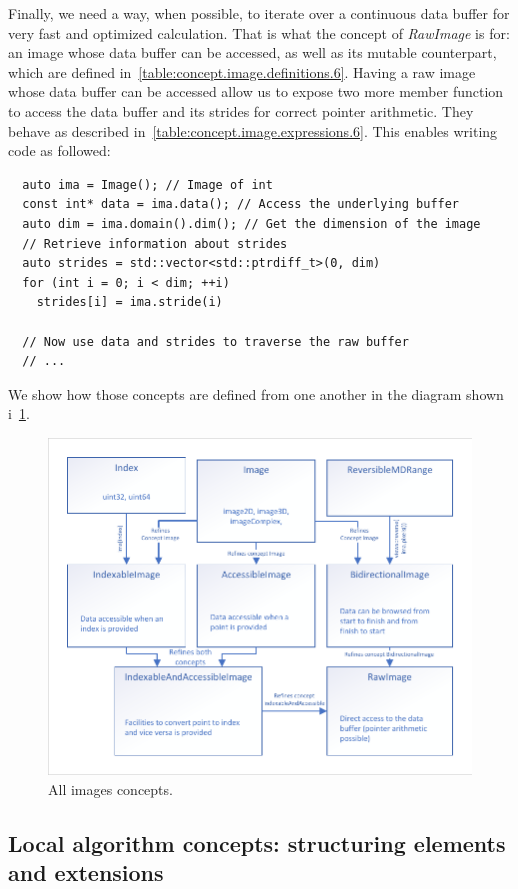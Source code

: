 Finally, we need a way, when possible, to iterate over a continuous data buffer for very fast and optimized calculation.
That is what the concept of \emph{RawImage} is for: an image whose data buffer can be accessed, as well as its mutable
counterpart, which are defined in~\cref{table:concept.image.definitions.6}. Having a raw image whose data buffer can be
accessed allow us to expose two more member function to access the data buffer and its strides for correct pointer
arithmetic. They behave as described in~\cref{table:concept.image.expressions.6}. This enables writing code as followed:
\begin{verbatim}
  auto ima = Image(); // Image of int
  const int* data = ima.data(); // Access the underlying buffer
  auto dim = ima.domain().dim(); // Get the dimension of the image
  // Retrieve information about strides
  auto strides = std::vector<std::ptrdiff_t>(0, dim)
  for (int i = 0; i < dim; ++i)
    strides[i] = ima.stride(i)

  // Now use data and strides to traverse the raw buffer
  // ...
\end{verbatim}

We show how those concepts are defined from one another in the diagram shown i~\cref{fig:concept.images}.

\begin{figure}[htbp]
  \centering
  \includegraphics[width=.8\linewidth]{../figures/concepts/images_all}
  \caption{All images concepts.}
  \label{fig:concept.images}
\end{figure}


\subsection{Local algorithm concepts: structuring elements and extensions}
\label{subsec:local.se.ext}

